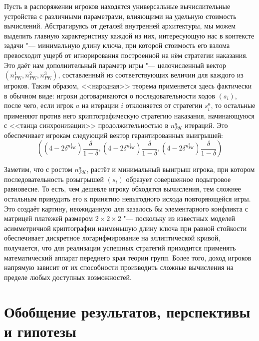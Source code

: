 Пусть в распоряжении игроков находятся универсальные вычислительные устройства с различными параметрами, влияющими на удельную стоимость вычислений. Абстрагируясь от деталей внутренней архитектуры, мы можем выделить главную характеристику каждой из них, интересующую нас в контексте задачи "--- минимальную длину ключа, при которой стоимость его взлома превосходит ущерб от игнорирования построенной на нём стратегии наказания. Это даёт нам дополнительный параметр игры "--- целочисленный вектор $(n_{PK}^1, n_{PK}^2, n_{PK}^3)$, составленный из соответствующих величин для каждого из игроков. Таким образом, <<народная>> теорема применяется здесь фактически в обычном виде: игроки договариваются о последовательности ходов $(s_i)$, после чего, если игрок $a$ на итерации $i$ отклоняется от стратегии $s^a_i$, то остальные применяют против него криптографическую стратегию наказания, начинающуюся с <<танца синхронизации>> продолжительностью в $n_{PK}^a$ итераций. Это обеспечивает игрокам следующий вектор гарантированных выигрышей:
\begin{equation*}
	((4 - 2 \delta^{n_{PK}^1}) \frac{\delta}{1-\delta}, (4 - 2 \delta^{n_{PK}^2}) \frac{\delta}{1-\delta}, (4 - 2 \delta^{n_{PK}^3}) \frac{\delta}{1-\delta})
\end{equation*}

Заметим, что с ростом $n_{PK}^a$, растёт и минимальный выигрыш игрока, при котором последовательность розыгрышей $(s_i)$ образует совершенное подыгровое равновесие. То есть, чем дешевле игроку обходятся вычисления, тем сложнее остальным принудить его к принятию невыгодного исхода повторяющейся игры. Это создаёт картину, неожиданную для казалось бы элементарного конфликта с матрицей платежей размером $2 \times 2 \times 2$ "--- поскольку из известных моделей асимметричной криптографии наименьшую длину ключа при равной стойкости обеспечивает дискретное логарифмирование на эллиптической кривой, получается, что для реализации успешных стратегий приходится применять математический аппарат переднего края теории групп. Более того, доход игроков напрямую зависит от их способности производить сложные вычисления на пределе любых доступных возможностей.

\section{Обобщение результатов, перспективы и гипотезы}\label{sec:ch3/sect5}

